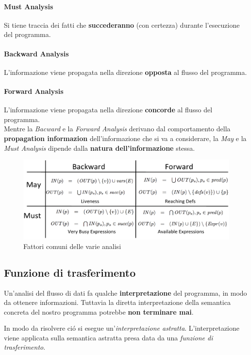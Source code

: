 \paragraph{Must Analysis}
Si tiene traccia dei fatti che \textbf{succederanno} (con certezza) durante
l'esecuzione del programma.
\paragraph{Backward Analysis}
L'informazione viene propagata nella direzione \textbf{opposta} al flusso del
programma.
\paragraph{Forward Analysis}
L'informazione viene propagata nella direzione \textbf{concorde} al flusso del
programma. \\

Mentre la \textit{Bacward} e la \textit{Forward Analysis} derivano dal
comportamento della \textbf{propagation informazion} dell'informazione che si
va a considerare, la \textit{May} e la \textit{Must Analysis} dipende dalla
\textbf{natura dell'informazione} stessa.

\begin{figure}[H]
  \centering
  \includegraphics[scale=0.4]{res/image/commonalities_information}
  \caption{Fattori comuni delle varie analisi}
  \label{img:commonalities_information}
\end{figure}

\subsection{Funzione di trasferimento}
Un'analisi del flusso di dati fa qualche \textbf{interpretazione} del
programma, in modo da ottenere informazioni. Tuttavia la diretta
interpretazione della semantica concreta del nostro programma potrebbe
\textbf{non terminare mai}.

In modo da risolvere ci\'o si esegue un'\textit{interpretazione astratta}.
L'interpretazione viene applicata sulla semantica astratta presa data da una
\textit{funzione di trasferimento}.

